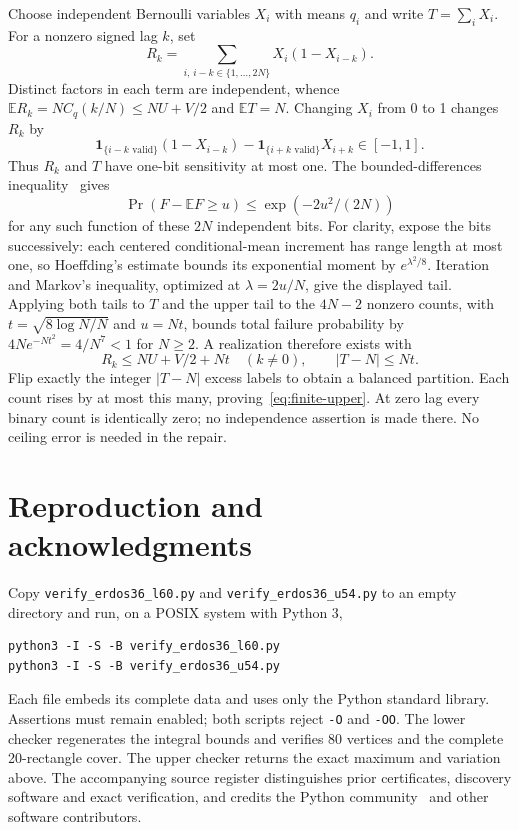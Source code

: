\documentclass[10pt]{article}
\newcommand{\ind}{\mathbf 1}
\begin{document}
Choose independent Bernoulli variables $X_i$ with means $q_i$ and write $T=\sum_iX_i$.
For a nonzero signed lag $k$, set
\[
R_k=\sum_{i,\,i-k\in\{1,\ldots,2N\}}X_i(1-X_{i-k}).
\]
Distinct factors in each term are independent, whence
$\mathbb ER_k=NC_q(k/N)\leq NU+V/2$ and $\mathbb ET=N$.
Changing $X_i$ from 0 to 1 changes $R_k$ by
\[
\ind_{\{i-k\text{ valid}\}}(1-X_{i-k})-
\ind_{\{i+k\text{ valid}\}}X_{i+k}\in[-1,1].
\]
Thus $R_k$ and $T$ have one-bit sensitivity at most one.
The bounded-differences inequality~\cite{Hoeffding,McDiarmid} gives
\[
\Pr(F-\mathbb EF\geq u)\leq\exp(-2u^2/(2N))
\]
for any such function of these $2N$ independent bits.
For clarity, expose the bits successively: each centered conditional-mean increment has range length at most one, so Hoeffding's estimate bounds its exponential moment by $e^{\lambda^2/8}$. Iteration and Markov's inequality, optimized at $\lambda=2u/N$, give the displayed tail.
Applying both tails to $T$ and the upper tail to the $4N-2$ nonzero counts, with
$t=\sqrt{8\log N/N}$ and $u=Nt$, bounds total failure probability by
$4N e^{-Nt^2}=4/N^7<1$ for $N\geq2$.
A realization therefore exists with
\[
R_k\leq NU+V/2+Nt\quad(k\ne0),\qquad |T-N|\leq Nt.
\]
Flip exactly the integer $|T-N|$ excess labels to obtain a balanced partition.
Each count rises by at most this many, proving~\eqref{eq:finite-upper}.
At zero lag every binary count is identically zero; no independence assertion is made there.
No ceiling error is needed in the repair.

\section{Reproduction and acknowledgments}
Copy \texttt{verify\_erdos36\_l60.py} and \texttt{verify\_erdos36\_u54.py} to an empty directory and run, on a POSIX system with Python 3,
\begin{verbatim}
python3 -I -S -B verify_erdos36_l60.py
python3 -I -S -B verify_erdos36_u54.py
\end{verbatim}
Each file embeds its complete data and uses only the Python standard library.
Assertions must remain enabled; both scripts reject \texttt{-O} and \texttt{-OO}.
The lower checker regenerates the integral bounds and verifies 80 vertices and the complete 20-rectangle cover. The upper checker returns the exact maximum and variation above.
The accompanying source register distinguishes prior certificates, discovery software and exact verification, and credits the Python community~\cite{Python} and other software contributors.
\end{document}
